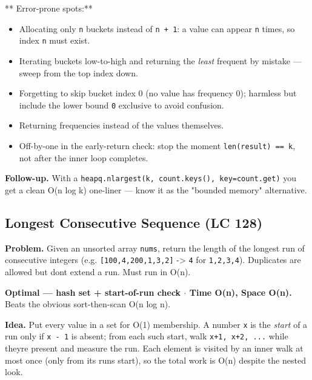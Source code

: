 \documentclass[11pt]{article}
\providecommand{\tightlist}{\setlength{\itemsep}{1pt}\setlength{\parskip}{0pt}}
\begin{document}
** Error-prone spots:**

\begin{itemize}
\tightlist
\item
  Allocating only \texttt{n} buckets instead of \texttt{n\ +\ 1}: a value can appear \texttt{n} times, so index \texttt{n} must exist.
\item
  Iterating buckets low-to-high and returning the \emph{least} frequent by mistake --- sweep from the top index down.
\item
  Forgetting to skip bucket index 0 (no value has frequency 0); harmless but include the lower bound \texttt{0} exclusive to avoid confusion.
\item
  Returning frequencies instead of the values themselves.
\item
  Off-by-one in the early-return check: stop the moment \texttt{len(result)\ ==\ k}, not after the inner loop completes.
\end{itemize}

\textbf{Follow-up.} With a \texttt{heapq.nlargest(k,\ count.keys(),\ key=count.get)} you get a clean O(n log k) one-liner --- know it as the "bounded memory" alternative.

\subsection{Longest Consecutive Sequence (LC 128)}\label{longest-consecutive-sequence-lc-128}

\textbf{Problem.} Given an unsorted array \texttt{nums}, return the length of the longest run of consecutive integers (e.g. \texttt{{[}100,4,200,1,3,2{]}} -\textgreater{} \texttt{4} for \texttt{1,2,3,4}). Duplicates are allowed but don\textquotesingle t extend a run. Must run in O(n).

\textbf{Optimal --- hash set + start-of-run check \(\cdot\) Time O(n), Space O(n).} Beats the obvious sort-then-scan O(n log n).

\textbf{Idea.} Put every value in a set for O(1) membership. A number \texttt{x} is the \emph{start} of a run only if \texttt{x\ -\ 1} is absent; from each such start, walk \texttt{x+1,\ x+2,\ ...} while they\textquotesingle re present and measure the run. Each element is visited by an inner walk at most once (only from its run\textquotesingle s start), so the total work is O(n) despite the nested look.

\end{document}

